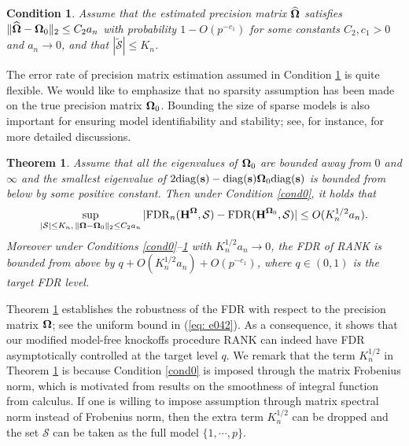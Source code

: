 \documentclass[11pt]{article}
\newtheorem{assumption}{Condition}%
\newtheorem{theorem}{Theorem}%
\newcommand{\bs}{\mbox{\bf s}}
\newcommand{\bH}{\mbox{\bf H}}
\newcommand{\bOmg}{\mbox{\boldmath $\Omega$}}
\newcommand{\wt}{\widetilde}
\newcommand{\wh}{\widehat}
\newcommand{\sbOmg}{\mbox{\scriptsize\boldmath $\Omega$}}
\newcommand{\diag}{\mathrm{diag}}
\begin{document}
\begin{assumption}\label{cond0-1}
Assume that the estimated precision matrix $\wh{\bOmg}$  satisfies $\|\wh{\bOmg} - \bOmg_{0}\|_2 \leq C_2a_n$ with probability $1-O(p^{-c_1})$  for some constants $C_2, c_1 > 0$ and $a_n\rightarrow 0$, and that
$|\wt{\mathcal{S}}|\leq K_n$.
\end{assumption}

The error rate of precision matrix estimation assumed in Condition \ref{cond0-1} is quite flexible. We would like to emphasize that no sparsity assumption has been made on the true precision matrix $\bOmg_{0}$. Bounding the size of sparse models is also important for ensuring model identifiability and stability; see, for instance, \cite{FanLv2013, Lv2013} for more detailed discussions.

\begin{theorem}\label{thm1}
Assume that all the eigenvalues of $\bOmg_0$ are bounded away from $0$ and $\infty$ and the smallest eigenvalue of $2\diag(\bs) - \diag(\bs)\bOmg_0\diag(\bs)$ is bounded from below by some positive constant. Then under Condition \ref{cond0}, it holds that
	\begin{equation}\label{eq: e042}
	\sup_{|\mathcal{S}|\leq K_n,\, \|\sbOmg - \sbOmg_0\|_2\leq C_2 a_n}|{\rm FDR}_n(\bH^{\sbOmg}, \mathcal{S}) - {\rm FDR}(\bH^{\sbOmg_0}, \mathcal{S})| \leq O(K_n^{1/2} a_n).
	\end{equation}
Moreover under Conditions \ref{cond0}--\ref{cond0-1} with  $K_n^{1/2} a_n\rightarrow 0$, the FDR of \emph{RANK} is bounded from above by $q + O(K_n^{1/2} a_n) + O(p^{-c_1})$,
where $q \in (0, 1)$ is the target FDR level.
\end{theorem}

Theorem \ref{thm1} establishes the robustness of the FDR with respect to the precision matrix $\bOmg$; see the uniform bound in (\ref{eq: e042}). As a consequence, it shows that our modified model-free knockoffs procedure RANK can indeed have FDR asymptotically controlled at the target level $q$. We remark that the term $K_n^{1/2}$ in Theorem \ref{thm1} is because Condition \ref{cond0} is imposed through the matrix Frobenius norm, which is motivated from results on the smoothness of integral function from calculus. If one is willing to impose assumption through matrix spectral norm instead of Frobenius norm, then the extra term $K_n^{1/2}$ can be dropped and the set $\mathcal{S}$ can be taken as the full model $\{1,\cdots, p\}$.
\end{document}
